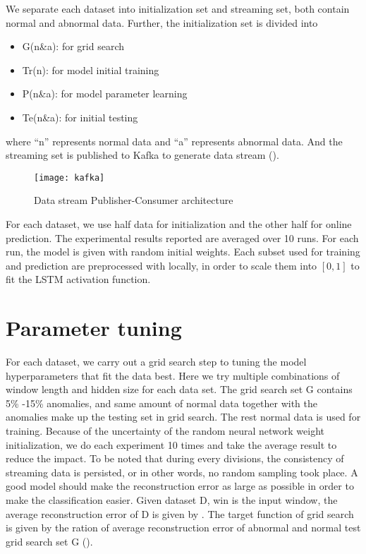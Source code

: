 We separate each dataset into initialization set and streaming set, both contain normal and abnormal data. Further, the initialization set is divided into 
\begin{itemize}
\item G(n\&a): for grid search
\item Tr(n): for model initial training
\item P(n\&a): for model parameter learning
\item Te(n\&a): for initial testing
\end{itemize}
where “n” represents normal data and “a” represents abnormal data. And the streaming set is published to Kafka to generate data stream ().

\begin{figure}[h]
\centering
\texttt{[image: kafka]}
\caption[Data stream Publisher-Consumer architecture]{Data stream Publisher-Consumer architecture}
\label{fig:kafka}
\end{figure}

For each dataset, we use half data for initialization and the other half for online prediction. The experimental results reported are averaged over 10 runs. For each run, the model is given with random initial weights. Each subset used for training and prediction are preprocessed with locally, in order to scale them into $[0,1]$ to fit the LSTM activation function.


\section{Parameter tuning}
\label{sec:parametertuning}

For each dataset, we carry out a grid search step to tuning the model hyperparameters that fit the data best. Here we try multiple combinations of window length and hidden size for each data set. The grid search set G contains 5\% -15\% anomalies, and same amount of normal data together with the anomalies make up the testing set in grid search. The rest normal data is used for training. Because of the uncertainty of the random neural network weight initialization, we do each experiment 10 times and take the average result to reduce the impact. To be noted that during every divisions, the consistency of streaming data is persisted, or in other words, no random sampling took place. A good model should make the reconstruction error as large as possible in order to make the classification easier. Given dataset D,  win is the input window, the average reconstruction error of D is given by . The target function of grid search is given by the ration of average reconstruction error of abnormal and normal test grid search set G ().

